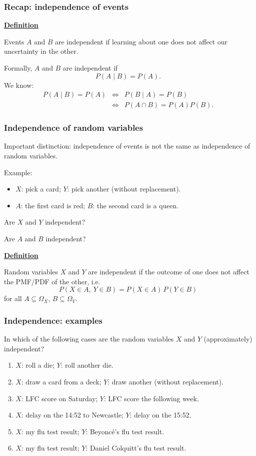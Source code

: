 \documentclass[t,8pt]{beamer}
\begin{document}
\begin{frame}
	\frametitle{Recap: independence of events}
	{\bf\underline{Definition}} \par
	Events $A$ and $B$ are independent if learning about one does not affect our uncertainty in the other. \par
	Formally, $A$ and $B$ are independent if
	$$P(A\mid B)=P(A).$$
	We know:
	\begin{eqnarray*}
		P(A\mid B)=P(A)
		&\Leftrightarrow& P(B\mid A)=P(B)\\
		&\Leftrightarrow& P(A\cap B)=P(A)P(B).
	\end{eqnarray*}
\end{frame}

\begin{frame}
	\frametitle{Independence of random variables}
	Important distinction: independence of events is not the same as independence of random variables. \par
	Example:
	\begin{itemize}
		\item $X$: pick a card; $Y$: pick another (without replacement).
		\item $A$: the first card is red; $B$: the second card is a queen.
	\end{itemize}
	Are $X$ and $Y$ independent? \par
	Are $A$ and $B$ independent? \par
	{\bf\underline{Definition}} \par
	Random variables $X$ and $Y$ are independent if the outcome of one does not affect the PMF/PDF of the other, i.e.
	$$P(X\in A,\ Y\in B)=P(X\in A)\,P(Y\in B)$$
	for all $A\subseteq\Omega_X$, $B\subseteq\Omega_Y$.
\end{frame}

\begin{frame}
	\frametitle{Independence: examples}
	In which of the following cases are the random variables $X$ and $Y$ (approximately) independent?
	\begin{enumerate}
		\item $X$: roll a die; $Y$: roll another die.
		\item $X$: draw a card from a deck; $Y$: draw another (without replacement).
		\item $X$: LFC score on Saturday; $Y$: LFC score the following week.
		\item $X$: delay on the 14:52 to Newcastle; $Y$: delay on the 15:52.
		\item $X$: my flu test result; $Y$: Beyoncé's flu test result.
		\item $X$: my flu test result; $Y$: Daniel Colquitt's flu test result.
	\end{enumerate}
\end{frame}
\end{document}
